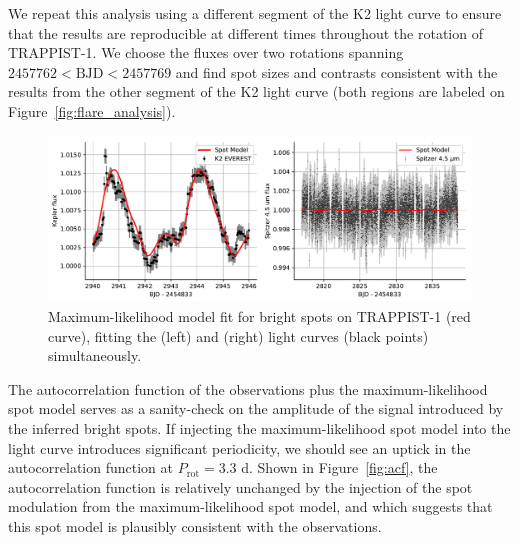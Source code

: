 We repeat this analysis using a different segment of the K2 light curve to ensure that the results are reproducible at different times throughout the rotation of TRAPPIST-1. We choose the fluxes over two rotations spanning $2457762 < \mathrm{BJD} < 2457769$ and find spot sizes and contrasts consistent with the results from the other segment of the K2 light curve (both regions are labeled on Figure~\ref{fig:flare_analysis}). 

\begin{figure}
\begin{center}
\includegraphics[scale=0.7]{trappist1_bright/best_bright_spot_model.pdf}
\end{center}
\caption{Maximum-likelihood model fit for bright spots on TRAPPIST-1 (red curve), fitting the \kepler (left) and \spitzer (right) light curves (black points) simultaneously. \label{fig:fits}}
\end{figure}

The autocorrelation function of the \spitzer observations plus the maximum-likelihood spot model serves as a sanity-check on the amplitude of the signal introduced by the inferred bright spots. If injecting the maximum-likelihood spot model into the \spitzer light curve introduces significant periodicity, we should see an uptick in the autocorrelation function at $P_\mathrm{rot} = 3.3$ d. Shown in Figure~\ref{fig:acf}, the autocorrelation function is relatively unchanged by the injection of the spot modulation from the maximum-likelihood spot model, and which suggests that this spot model is plausibly consistent with the \spitzer observations. 

